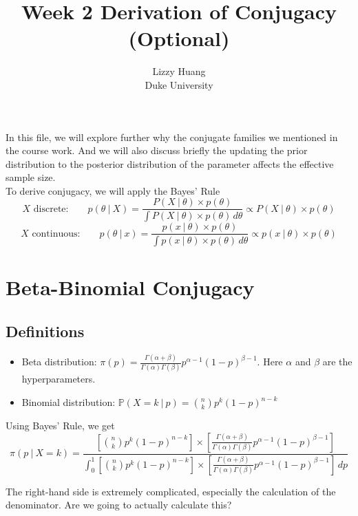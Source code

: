 \documentclass{article}
\def\dsst{\displaystyle}
\begin{document}
\title{Week 2 Derivation of Conjugacy (Optional)}
\author{Lizzy Huang\\  Duke University}
\date{}
\maketitle 

In this file, we will explore further why the conjugate families we mentioned in the course work. And we will also discuss briefly the updating the prior distribution to the posterior distribution of the parameter affects the effective sample size.\\

To derive conjugacy, we will apply the Bayes' Rule
$$ X \text{ discrete:}\qquad p(\theta ~|~X) = \frac{P(X~|~\theta)\times p(\theta)}{\dsst \int P(X~|~\theta)\times p(\theta)\, d\theta} \propto P(X~|~\theta)\times p(\theta) $$
$$ X \text{ continuous:}\qquad p(\theta ~|~x) = \frac{p(x~|~\theta)\times p(\theta)}{\dsst \int p(x~|~\theta)\times p(\theta)\, d\theta} \propto p(x~|~\theta)\times p(\theta) $$

\section{Beta-Binomial Conjugacy}

\subsection{Definitions}
\begin{itemize}
	\item Beta distribution: $\pi(p) = \dsst \frac{\Gamma(\alpha+\beta)}{\Gamma(\alpha)\Gamma(\beta)}p^{\alpha-1}(1-p)^{\beta-1}$. Here $\alpha$ and $\beta$ are the hyperparameters.
	
	\item Binomial distribution: $\mathbb{P}(X=k~|~p) =\dsst \binom{n}{k}p^k(1-p)^{n-k}$
\end{itemize}

Using Bayes' Rule, we get
$$ \pi(p~|~X=k) = \frac{\dsst \left[\binom{n}{k}p^k(1-p)^{n-k}\right]\times \left[\frac{\Gamma(\alpha+\beta)}{\Gamma(\alpha)\Gamma(\beta)}p^{\alpha-1}(1-p)^{\beta-1}\right]}{\dsst \int_0^1  \left[\binom{n}{k}p^k(1-p)^{n-k}\right]\times \left[\frac{\Gamma(\alpha+\beta)}{\Gamma(\alpha)\Gamma(\beta)}p^{\alpha-1}(1-p)^{\beta-1}\right]\, dp} $$

The right-hand side is extremely complicated, especially the calculation of the denominator. Are we going to actually calculate this?\\
\end{document}
